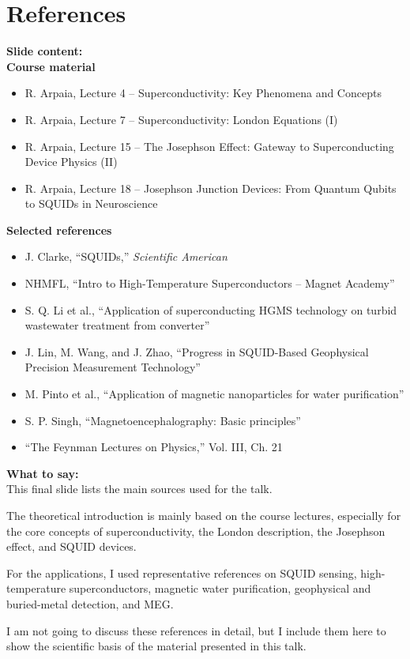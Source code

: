 \documentclass[11pt,a4paper]{article}
\newcommand{\points}[1]{{\color{accent}\textbf{Slide content:}}\\#1}
\newcommand{\speech}[1]{{\color{accent}\textbf{What to say:}}\\#1}
\begin{document}

\section{References}

\points{
\textbf{Course material}
\begin{itemize}
\item R. Arpaia, Lecture 4 -- Superconductivity: Key Phenomena and Concepts
\item R. Arpaia, Lecture 7 -- Superconductivity: London Equations (I)
\item R. Arpaia, Lecture 15 -- The Josephson Effect: Gateway to Superconducting Device Physics (II)
\item R. Arpaia, Lecture 18 -- Josephson Junction Devices: From Quantum Qubits to SQUIDs in Neuroscience
\end{itemize}

\textbf{Selected references}
\begin{itemize}
\item J. Clarke, ``SQUIDs,'' \textit{Scientific American}
\item NHMFL, ``Intro to High-Temperature Superconductors -- Magnet Academy''
\item S. Q. Li et al., ``Application of superconducting HGMS technology on turbid wastewater treatment from converter''
\item J. Lin, M. Wang, and J. Zhao, ``Progress in SQUID-Based Geophysical Precision Measurement Technology''
\item M. Pinto et al., ``Application of magnetic nanoparticles for water purification''
\item S. P. Singh, ``Magnetoencephalography: Basic principles''
\item ``The Feynman Lectures on Physics,'' Vol. III, Ch. 21
\end{itemize}
}

\speech{
This final slide lists the main sources used for the talk.

The theoretical introduction is mainly based on the course lectures, especially for the core concepts of superconductivity, the London description, the Josephson effect, and SQUID devices.

For the applications, I used representative references on SQUID sensing, high-temperature superconductors, magnetic water purification, geophysical and buried-metal detection, and MEG.

I am not going to discuss these references in detail, but I include them here to show the scientific basis of the material presented in this talk.
}
\end{document}
